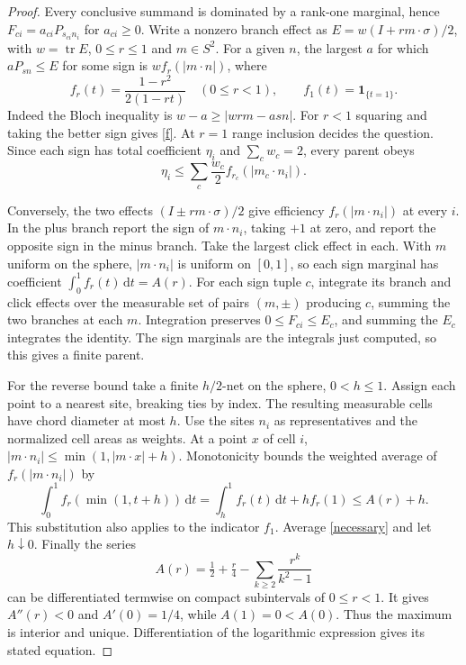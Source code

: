 \documentclass[11pt,a4paper]{article}
\theoremstyle{remark}
\newcommand{\tr}{\operatorname{tr}}
\newcommand{\dd}{\,\mathrm d}
\begin{document}
\begin{proof}
Every conclusive summand is dominated by a rank-one marginal, hence \(F_{ci}=a_{ci}P_{s_{ci}n_i}\) for \(a_{ci}\ge0\). Write a nonzero branch effect as \(E=w(I+r m\cdot\sigma)/2\), with \(w=\tr E\), \(0\le r\le1\) and \(m\in S^2\). For a given \(n\), the largest \(a\) for which \(aP_{s n}\le E\) for some sign is \(w f_r(|m\cdot n|)\), where
\begin{equation}\label{f}
 f_r(t)=\frac{1-r^2}{2(1-rt)}\quad (0\le r<1),\qquad
 f_1(t)=\mathbf1_{\{t=1\}}.
\end{equation}
Indeed the Bloch inequality is \(w-a\ge |wrm-asn|\). For \(r<1\) squaring and taking the better sign gives \eqref{f}. At \(r=1\) range inclusion decides the question. Since each sign has total coefficient \(\eta_i\) and \(\sum_c w_c=2\), every parent obeys
\begin{equation}\label{necessary}
    \eta_i\le\sum_c\frac{w_c}{2} f_{r_c}(|m_c\cdot n_i|).
\end{equation}

Conversely, the two effects \((I\pm r m\cdot\sigma)/2\) give efficiency \(f_r(|m\cdot n_i|)\) at every \(i\). In the plus branch report the sign of \(m\cdot n_i\), taking \(+1\) at zero, and report the opposite sign in the minus branch. Take the largest click effect in each. With \(m\) uniform on the sphere, \(|m\cdot n_i|\) is uniform on \([0,1]\), so each sign marginal has coefficient \(\int_0^1f_r(t)\dd t=A(r)\). For each sign tuple \(c\), integrate its branch and click effects over the measurable set of pairs \((m,\pm)\) producing \(c\), summing the two branches at each \(m\). Integration preserves \(0\le F_{ci}\le E_c\), and summing the \(E_c\) integrates the identity. The sign marginals are the integrals just computed, so this gives a finite parent.

For the reverse bound take a finite \(h/2\)-net on the sphere, \(0<h\le1\). Assign each point to a nearest site, breaking ties by index. The resulting measurable cells have chord diameter at most \(h\). Use the sites \(n_i\) as representatives and the normalized cell areas as weights. At a point \(x\) of cell \(i\), \(|m\cdot n_i|\le\min(1,|m\cdot x|+h)\). Monotonicity bounds the weighted average of \(f_r(|m\cdot n_i|)\) by
\begin{equation}\label{clipped}
 \int_0^1 f_r(\min(1,t+h))\dd t
 =\int_h^1 f_r(t)\dd t+h f_r(1)\le A(r)+h .
\end{equation}
This substitution also applies to the indicator \(f_1\). Average \eqref{necessary} and let \(h\downarrow0\). Finally the series
\[
            A(r)=\tfrac12+\tfrac r4-\sum_{k\ge2}\frac{r^k}{k^2-1}
\]
can be differentiated termwise on compact subintervals of \(0\le r<1\). It gives \(A''(r)<0\) and \(A'(0)=1/4\), while \(A(1)=0<A(0)\). Thus the maximum is interior and unique. Differentiation of the logarithmic expression gives its stated equation.
\end{proof}
\end{document}

